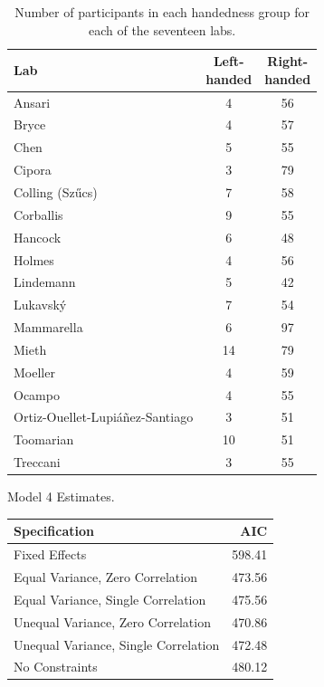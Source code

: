 \documentclass[A4paper,man,floatsintext]{apa6}
\theoremstyle{definition}
\theoremstyle{definition}
\theoremstyle{definition}
\theoremstyle{remark}
\begin{document}
\begin{appendix}
\begin{table}
\caption{\label{tab:hand}Number of participants in each handedness group for each of the seventeen labs.}
\centering
\begin{tabular}[t]{lcc}
\toprule
Lab & \makecell[c]{Left-\\handed} & \makecell[c]{Right-\\handed}\\
\midrule
Ansari & 4 & 56\\
Bryce & 4 & 57\\
Chen & 5 & 55\\
Cipora & 3 & 79\\
Colling (Szűcs) & 7 & 58\\
Corballis & 9 & 55\\
Hancock & 6 & 48\\
Holmes & 4 & 56\\
Lindemann & 5 & 42\\
Lukavský & 7 & 54\\
Mammarella & 6 & 97\\
Mieth & 14 & 79\\
Moeller & 4 & 59\\
Ocampo & 4 & 55\\
Ortiz-Ouellet-Lupiáñez-Santiago & 3 & 51\\
Toomarian & 10 & 51\\
Treccani & 3 & 55\\
\bottomrule
\end{tabular}
\end{table}

\begin{table}[!p]
\caption{\label{tab:mod4}Model 4 Estimates.}
\begin{subtable}{\textwidth}
\centering
\begin{table}[H]\centering\begingroup\fontsize{10}{12}\selectfont

\begin{tabular}{lr}
\toprule
Specification & AIC\\
\midrule
Fixed Effects & 598.41\\
Equal Variance, Zero Correlation & 473.56\\
Equal Variance, Single Correlation & 475.56\\
Unequal Variance, Zero Correlation & 470.86\\
Unequal Variance, Single Correlation & 472.48\\
No Constraints & 480.12\\
\bottomrule
\end{tabular}\endgroup{}
\end{table}
\end{subtable}
\begin{subtable}{\textwidth}
\caption{Fixed Effect Estimates}
\centering
\begin{table}[H]\centering\begingroup\fontsize{10}{12}\selectfont


\end{table}
\end{subtable}
\end{table}
\end{appendix}
\end{document}
